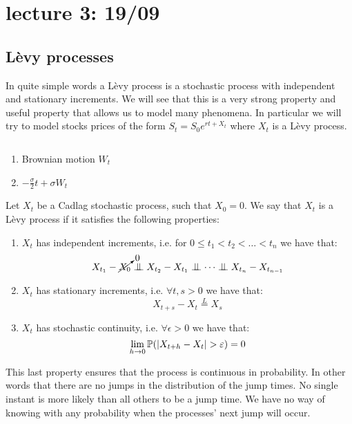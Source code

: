\chapter{lecture 3: 19/09}

\section{Lèvy processes}

In quite simple words a Lèvy process is a stochastic process with independent
and stationary increments. We will see that this is a very strong property and
useful property that allows us to model many phenomena. In particular we will
try to model stocks prices of the form $S_t = S_0 e^{rt + X_t}$ where $X_t$ is a
Lèvy process. 

\begin{example}
    $ $ \\
    \begin{enumerate}
        \item Brownian motion $W_t$
        \item $-\frac{\sigma}{2}t + \sigma W_t$
    \end{enumerate}
\end{example}

\begin{definition}
    Let $X_t$ be a Cadlag stochastic process, such that $X_0=0$. We say that
    $X_t$ is a Lèvy process if it satisfies the following properties:
    \begin{enumerate}[i]
        \item $X_t$ has independent increments, i.e. for
            $0 \leq t_1 < t_2 < \dots < t_n$ we have that: 
            \[
                X_{t_1} - \cancelto{0}{X_0} \indep X_{t_2} - X_{t_1} \indep \dots \indep
                    X_{t_n} - X_{t_{n-1}}
            \]
        \item $X_t$ has stationary increments, i.e. $\forall t,s > 0$ we have
            that:
            \[
                X_{t+s} - X_t \overset{L}{=} X_s
            \]
        \item $X_t$ has stochastic continuity, i.e. $\forall \epsilon > 0$ we
            have that:
            \[
                \lim_{h \to 0} \P(|X_{t+h} - X_t| > \epsilon) = 0
            \]
    \end{enumerate}
\end{definition}

This last property ensures that the process is continuous in probability. In
other words that there are no jumps in the distribution of the jump times. No
single instant is more likely than all others to be a jump time. We have no way
of knowing with any probability when the processes' next jump will occur.

